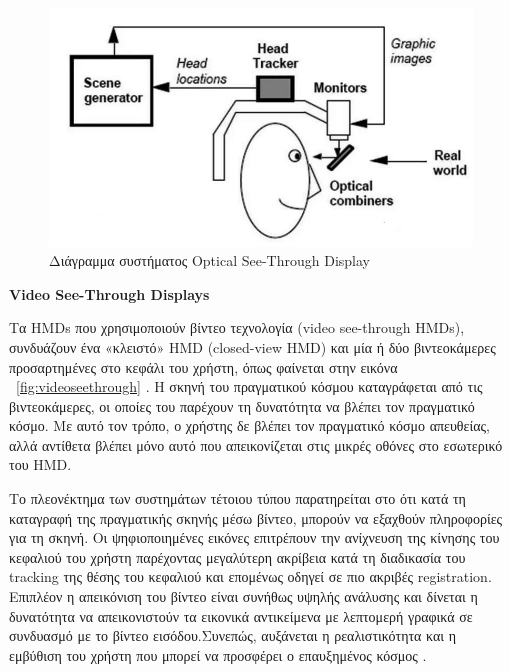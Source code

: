 \begin{figure}[H]
    \centering
    \includegraphics[scale=0.7, angle=0]{Files/Figures/optical.jpg}
    \caption[Διάγραμμα συστήματος Optical See-Through Display \cite{azuma1997}]{ Διάγραμμα συστήματος Optical See-Through Display \cite{azuma1997}}
    \label{fig:opticalseethrough}
\end{figure}



\textbf{Video See-Through Displays}

Τα HMDs που χρησιμοποιούν βίντεο τεχνολογία (video see-through HMDs), συνδυάζουν ένα «κλειστό» HMD (closed-view HMD) και μία ή δύο βιντεοκάμερες προσαρτημένες στο κεφάλι του χρήστη, όπως φαίνεται στην εικόνα ~\ref{fig:videoseethrough} . Η σκηνή του πραγματικού κόσμου καταγράφεται από τις βιντεοκάμερες, οι οποίες του παρέχουν τη δυνατότητα να βλέπει τον πραγματικό κόσμο. Με αυτό τον τρόπο, ο χρήστης δε βλέπει τον πραγματικό κόσμο απευθείας, αλλά αντίθετα βλέπει μόνο αυτό που απεικονίζεται στις μικρές οθόνες στο εσωτερικό του HMD.  

 

Το πλεονέκτημα των συστημάτων τέτοιου τύπου παρατηρείται στο ότι κατά τη καταγραφή της πραγματικής σκηνής μέσω βίντεο, μπορούν να εξαχθούν πληροφορίες για τη σκηνή. Οι ψηφιοποιημένες εικόνες επιτρέπουν την ανίχνευση της κίνησης του κεφαλιού του χρήστη παρέχοντας μεγαλύτερη ακρίβεια κατά τη διαδικασία του tracking της θέσης του κεφαλιού και επομένως οδηγεί σε πιο ακριβές registration. Επιπλέον η απεικόνιση του βίντεο είναι συνήθως υψηλής ανάλυσης και δίνεται η δυνατότητα να απεικονιστούν τα εικονικά αντικείμενα με λεπτομερή γραφικά σε συνδυασμό με το βίντεο εισόδου.Συνεπώς, αυξάνεται η ρεαλιστικότητα και η εμβύθιση του χρήστη που μπορεί να προσφέρει ο επαυξημένος κόσμος \cite{krevelen2010} .


